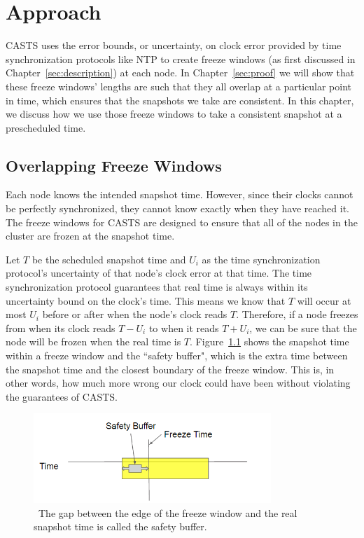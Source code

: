 \chapter{Approach}
\label{sec:approach}

CASTS uses the error bounds, or uncertainty, on clock
error provided by time synchronization protocols like NTP to create
freeze windows (as first discussed in Chapter~\ref{sec:description})
at each node. In Chapter~\ref{sec:proof} we will show that these freeze
windows' lengths are such that they all overlap at a particular point
in time, which ensures that the snapshots we take are consistent. In
this chapter, we discuss how we use those freeze windows to take a
consistent snapshot at a prescheduled time.

\section{Overlapping Freeze Windows}
\label{sec:overlapping}

Each node knows the intended snapshot time. However, since their
clocks cannot be perfectly synchronized, they cannot know exactly when
they have reached it. The freeze windows for CASTS are
designed to ensure that all of the nodes in the cluster are frozen at
the snapshot time.

Let $T$ be the scheduled snapshot time and $U_i$ as the time
synchronization protocol's uncertainty of that node's clock error at
that time. The time synchronization protocol guarantees that real time
is always within its uncertainty bound on the clock's time. This means
we know that $T$ will occur at most $U_i$ before or after when the
node's clock reads $T$. Therefore, if a node freezes from when its
clock reads $T - U_i$ to when it reads $T + U_i$, we can be sure that
the node will be frozen when the real time is $T$.
Figure~\ref{fig:safety-buff} shows the snapshot time within a freeze
window and the ``safety buffer", which is the extra time between the
snapshot time and the closest boundary of the freeze window. This is,
in other words, how much more wrong our clock could have been without
violating the guarantees of CASTS.

\begin{figure}
\includegraphics[width=0.8\textwidth]{safety-diagram.png}
\caption{~The gap between the edge of the freeze window and the real snapshot time is called the safety buffer.}
\label{fig:safety-buff}
\end{figure}


